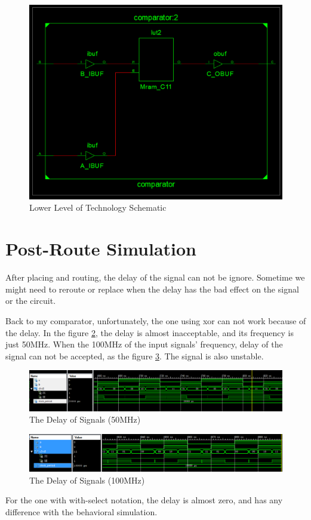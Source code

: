 \documentclass{article}
\begin{document}
\begin{figure}[h!]
\centering
\includegraphics[width=1\linewidth]{homework4-4}
\caption{Lower Level of Technology Schematic}
\label{fig:homework4-4}
\end{figure}


    \section{Post-Route Simulation}
    \label{sec:postroutesimulation}
    
    After placing and routing, the delay of the signal can not be ignore.
    Sometime we might need to reroute or replace when the delay has the bad effect on the signal or
    the circuit.
    
    Back to my comparator, unfortunately, the one using xor can not work because of the delay.
    In the figure \ref{fig:homework4-5}, the delay is almost inacceptable, and its frequency is just 50MHz. When the 100MHz of the input signals' frequency, delay of the signal can not be
    accepted, as the figure \ref{fig:homework4-6}. The signal is also unstable.
    
\begin{figure}[h!]
\centering
\includegraphics[width=1\linewidth]{homework4-5}
\caption{The Delay of Signals (50MHz)}
\label{fig:homework4-5}
\end{figure}

\begin{figure}[h!]
\centering
\includegraphics[width=1\linewidth]{homework4-6}
\caption{The Delay of Signals (100MHz)}
\label{fig:homework4-6}
\end{figure}

    For the one with with-select notation, the delay is almost zero, and has any difference with
    the behavioral simulation. 
    
   
\end{document}
